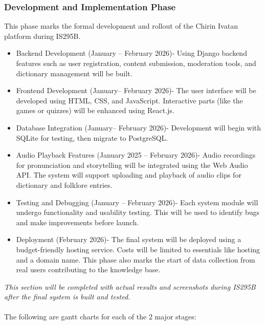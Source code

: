                 \subsubsection{Development and Implementation Phase }
                This phase marks the formal development and rollout of the Chirin Ivatan platform during IS295B.
                \begin{itemize}
                \item Backend Development (January  – February 2026)- Using Django backend features such as user registration, content submission, moderation tools, and dictionary management will be built.
                \item Frontend Development (January– February 2026)- The user interface will be developed using HTML, CSS, and JavaScript. Interactive parts (like the games or quizzes) will be enhanced using React.js.
                \item Database Integration (January– February 2026)- Development will begin with SQLite for testing, then migrate to PostgreSQL.
                \item Audio Playback Features (January 2025 – February 2026)- Audio recordings for pronunciation and storytelling will be integrated using the Web Audio API. The system will support uploading and playback of audio clips for dictionary and folklore entries.
                \item Testing and Debugging (January – February 2026)- Each system module will undergo functionality and usability testing. This will be used to identify bugs and make improvements before launch.
                \item Deployment (February 2026)- The final system will be deployed using a budget-friendly hosting service. Costs will be limited to essentials like hosting and a domain name. This phase also marks the start of data collection from real users contributing to the knowledge base.
            \end{itemize} 

    \textit{This section will be completed with actual results and screenshots during IS295B after the final system is built and tested.}\\\\
    The following are gantt charts for each of the 2 major stages: 

